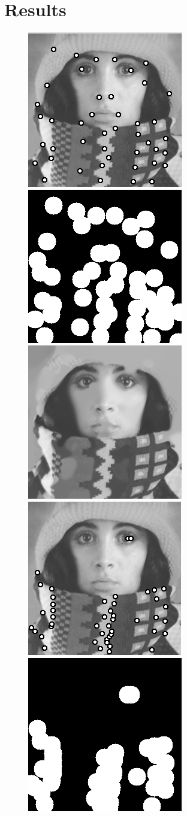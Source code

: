 \section{Results}\label{sec:Results}

\begin{figure}
    \centering
    \includegraphics[width=0.31\linewidth]{../Images/trui_corners_cnms.png}
    \includegraphics[width=0.31\linewidth]{../Images/trui-mask_cnms.png}
    \includegraphics[width=0.31\linewidth]{../Images/trui-inpaint_cnms.png}\\
    \vspace{0.2cm}
    \includegraphics[width=0.31\linewidth]{../Images/trui_corners_non_cnms.png}
    \includegraphics[width=0.31\linewidth]{../Images/trui-mask_non_cnms.png}

\end{figure}
